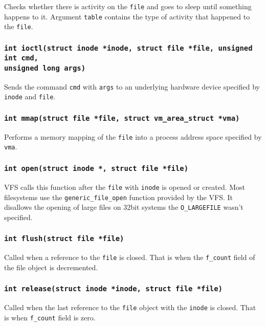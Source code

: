 Checks whether there is activity on the \texttt{file} and goes to sleep until
something happens to it. Argument \texttt{table} contains the type of activity that
happened to the \texttt{file}.

\subsubsection{\texttt{int ioctl(struct inode *inode, struct file *file, unsigned int
cmd,\\unsigned long args)}}

Sends the command \texttt{cmd} with \texttt{args} to an underlying hardware device
specified by \texttt{inode} and \texttt{file}.

\subsubsection{\texttt{int mmap(struct file *file, struct vm\_area\_struct *vma)}}

Performs a memory mapping of the \texttt{file} into a process address space specified
by \texttt{vma}.

\subsubsection{\texttt{int open(struct inode *, struct file *file)}}

VFS calls this function after the \texttt{file} with \texttt{inode} is opened or
created. Most filesystems use the \texttt{generic\_file\_open} function provided by
the VFS. It disallows the opening of large files on 32bit systems the \texttt{O\_LARGEFILE}
wasn't specified.

\subsubsection{\texttt{int flush(struct file *file)}}

Called when a reference to the \texttt{file} is closed. That is when the
\texttt{f\_count} field of the file object is decremented.

\subsubsection{\texttt{int release(struct inode *inode, struct file *file)}}

Called when the last reference to the \texttt{file} object with the \texttt{inode} is
closed. That is when \texttt{f\_count} field is zero.

